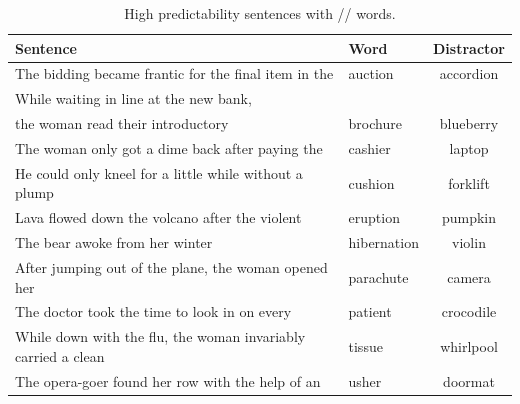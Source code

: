 \begin{table}[!ht]
\caption{High predictability sentences with /\textesh/ words.}
\label{tbl:senthighsh}
\small
\centering
\begin{tabular}{llc}
\toprule
Sentence                                                                     & Word        & Distractor  \\
\midrule
The bidding became frantic for the final item in the                     & auction     & accordion  \\
While waiting in line at the new bank,  & & \\
the woman read their introductory & brochure    & blueberry  \\
The woman only got a dime back after paying the                          & cashier     & laptop     \\
He could only kneel for a little while without a plump                   & cushion     & forklift   \\
Lava flowed down the volcano after the violent                           & eruption    & pumpkin    \\
The bear awoke from her winter                                           & hibernation & violin     \\
After jumping out of the plane, the woman opened her                     & parachute   & camera     \\
The doctor took the time to look in on every                             & patient     & crocodile  \\
While down with the flu, the woman invariably carried a clean            & tissue      & whirlpool  \\
The opera-goer found her row with the help of an                         & usher       & doormat   \\
\bottomrule
\end{tabular}
\end{table}

